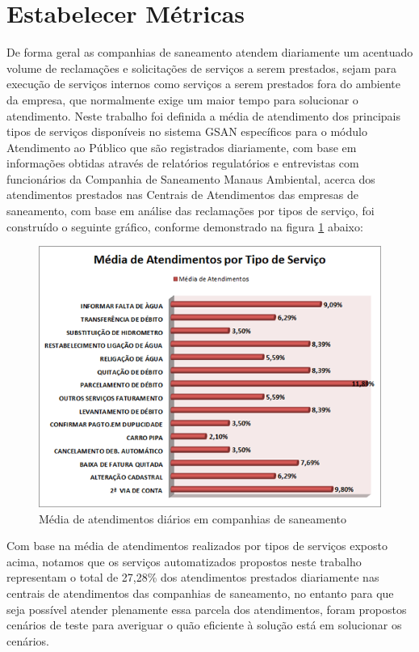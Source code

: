 \section{Estabelecer Métricas}
De forma geral as companhias de saneamento atendem diariamente um acentuado volume de reclamações e solicitações de serviços a serem prestados, sejam para execução de serviços internos como serviços a serem prestados fora do ambiente da empresa, que normalmente exige um maior tempo para solucionar o atendimento.
Neste trabalho foi definida a média de atendimento dos principais tipos de serviços disponíveis no sistema GSAN específicos para o módulo Atendimento ao Público que são registrados diariamente, com base em informações obtidas através de relatórios regulatórios e entrevistas com funcionários da Companhia de Saneamento Manaus Ambiental, acerca dos atendimentos prestados nas Centrais de Atendimentos das empresas de saneamento, com base em análise das reclamações por tipos de serviço, foi construído o seguinte gráfico, conforme demonstrado na figura \ref{figura:mediaAtendimentos} abaixo:

\begin{figure}[!htb]
	\centering
	\includegraphics{figuras/media_atendimentos.png}
	\caption{Média de atendimentos diários em companhias de saneamento}	
	\label{figura:mediaAtendimentos}
\end{figure}

Com base na média de atendimentos realizados por tipos de serviços exposto acima, notamos que os serviços automatizados propostos neste trabalho representam o total de 27,28\% dos atendimentos prestados diariamente nas centrais de atendimentos das companhias de saneamento, no entanto para que seja possível atender plenamente essa parcela dos atendimentos, foram propostos cenários de teste para averiguar o quão eficiente à solução está em solucionar os cenários.




